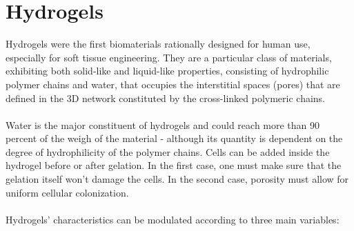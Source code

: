 \chapter{Hydrogels}
Hydrogels were the first biomaterials rationally designed for human use, especially for soft tissue engineering. 
They are a particular class of materials, exhibiting both solid-like and liquid-like properties, consisting of hydrophilic polymer chains and water, that occupies the interstitial spaces (pores) that are defined in the 3D network constituted by the cross-linked polymeric chains. 
\\
\\
\noindent
Water is the major constituent of hydrogels and could reach more than 90 percent of the weigh of the material - although its quantity is dependent on the degree of hydrophilicity of the polymer chains. 
Cells can be added inside the hydrogel before or after gelation. 
In the first case, one must make sure that the gelation itself won’t damage the cells. 
In the second case, porosity must allow for uniform cellular colonization. 
\\
\\
\noindent
Hydrogels’ characteristics can be modulated according to three main variables:
